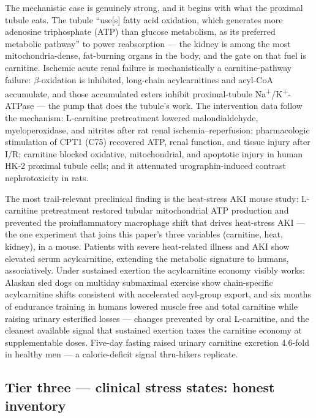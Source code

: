 The mechanistic case is genuinely strong, and it begins with what the proximal tubule eats. The tubule ``use[s] fatty acid oxidation, which generates more adenosine triphosphate (ATP) than glucose metabolism, as its preferred metabolic pathway'' to power reabsorption --- the kidney is among the most mitochondria-dense, fat-burning organs in the body, and the gate on that fuel is carnitine. Ischemic acute renal failure is mechanistically a carnitine-pathway failure: $\beta$-oxidation is inhibited, long-chain acylcarnitines and acyl-CoA accumulate, and those accumulated esters inhibit proximal-tubule Na\textsuperscript{+}/K\textsuperscript{+}-ATPase --- the pump that does the tubule's work. The intervention data follow the mechanism: L-carnitine pretreatment lowered malondialdehyde, myeloperoxidase, and nitrites after rat renal ischemia--reperfusion; pharmacologic stimulation of CPT1 (C75) recovered ATP, renal function, and tissue injury after I/R; carnitine blocked oxidative, mitochondrial, and apoptotic injury in human HK-2 proximal tubule cells; and it attenuated urographin-induced contrast nephrotoxicity in rats.

The most trail-relevant preclinical finding is the heat-stress AKI mouse study: L-carnitine pretreatment restored tubular mitochondrial ATP production and prevented the proinflammatory macrophage shift that drives heat-stress AKI --- the one experiment that joins this paper's three variables (carnitine, heat, kidney), in a mouse. Patients with severe heat-related illness and AKI show elevated serum acylcarnitine, extending the metabolic signature to humans, associatively. Under sustained exertion the acylcarnitine economy visibly works: Alaskan sled dogs on multiday submaximal exercise show chain-specific acylcarnitine shifts consistent with accelerated acyl-group export, and six months of endurance training in humans lowered muscle free and total carnitine while raising urinary esterified losses --- changes prevented by oral L-carnitine, and the cleanest available signal that sustained exertion taxes the carnitine economy at supplementable doses. Five-day fasting raised urinary carnitine excretion 4.6-fold in healthy men --- a calorie-deficit signal thru-hikers replicate.

\subsection{Tier three --- clinical stress states: honest inventory}

